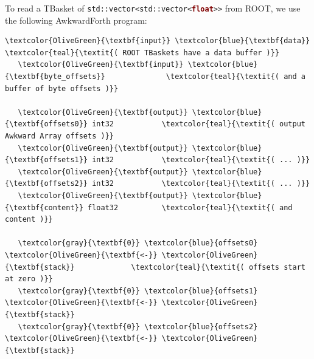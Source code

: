 \documentclass{webofc}
\begin{document}
To read a TBasket of {\tt std::vector<std::vector<\textcolor{Maroon}{\textbf{float}}>{}>} from ROOT, we use the following AwkwardForth program:

\small
\begin{Verbatim}[commandchars=\\\{\}]
   \textcolor{OliveGreen}{\textbf{input}} \textcolor{blue}{\textbf{data}}                      \textcolor{teal}{\textit{( ROOT TBaskets have a data buffer )}}
   \textcolor{OliveGreen}{\textbf{input}} \textcolor{blue}{\textbf{byte_offsets}}              \textcolor{teal}{\textit{( and a buffer of byte offsets )}}

   \textcolor{OliveGreen}{\textbf{output}} \textcolor{blue}{\textbf{offsets0}} int32           \textcolor{teal}{\textit{( output Awkward Array offsets )}}
   \textcolor{OliveGreen}{\textbf{output}} \textcolor{blue}{\textbf{offsets1}} int32           \textcolor{teal}{\textit{( ... )}}
   \textcolor{OliveGreen}{\textbf{output}} \textcolor{blue}{\textbf{offsets2}} int32           \textcolor{teal}{\textit{( ... )}}
   \textcolor{OliveGreen}{\textbf{output}} \textcolor{blue}{\textbf{content}} float32          \textcolor{teal}{\textit{( and content )}}

   \textcolor{gray}{\textbf{0}} \textcolor{blue}{offsets0} \textcolor{OliveGreen}{\textbf{<-}} \textcolor{OliveGreen}{\textbf{stack}}             \textcolor{teal}{\textit{( offsets start at zero )}}
   \textcolor{gray}{\textbf{0}} \textcolor{blue}{offsets1} \textcolor{OliveGreen}{\textbf{<-}} \textcolor{OliveGreen}{\textbf{stack}}
   \textcolor{gray}{\textbf{0}} \textcolor{blue}{offsets2} \textcolor{OliveGreen}{\textbf{<-}} \textcolor{OliveGreen}{\textbf{stack}}


\end{Verbatim}
\end{document}
